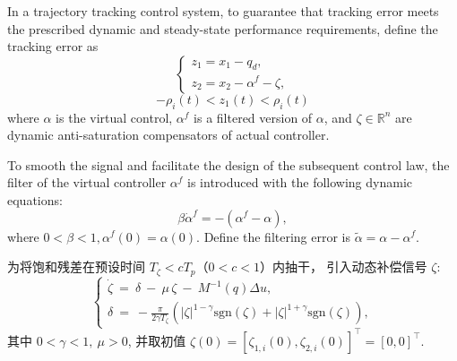 \documentclass[pdflatex,sn-mathphys-num]{sn-jnl}%
\theoremstyle{thmstyleone}%
\theoremstyle{thmstyletwo}%
\theoremstyle{thmstylethree}%
\begin{document}
\par In a trajectory tracking control system, to  guarantee that tracking error meets the prescribed dynamic and steady-state performance requirements, define the tracking error as
\begin{equation}\label{eq:20}
	\begin{cases}
		z_{1} = x_{1} - q_{d}, \\
	  z_{2} = x_{2} -\alpha^{f}-\zeta,
	\end{cases}
	\end{equation}
	\begin{equation}\label{eq:20}
			-\rho_i(t)<z_{1}(t)<\rho_i(t)
		\end{equation}
	where $\alpha$ is the virtual control, $\alpha^{f}$ is a filtered version of ${\alpha}$, and $\zeta \in\mathbb{R}^{n}$ are dynamic anti-saturation compensators of actual controller.






 To smooth the signal and facilitate the design of the subsequent control law, the filter of the virtual controller $\alpha^{f}$ is introduced with the following dynamic equations:
\begin{equation}\label{eq:22}
	\beta \dot{\alpha}^{f}
	= -\left(\alpha^{f}-\alpha\right),	
\end{equation}
where $0<\beta<1, \alpha^{f}(0)=\alpha(0)$. Define the filtering error is
$\tilde{\alpha}= \alpha-\alpha^{f}$.


为将饱和残差在预设时间 $T_\zeta<cT_p$（$0<c<1$）内抽干， 引入动态补偿信号 $\zeta$:
\begin{equation}\label{eq:zeta2-pts}
	\begin{cases}
\dot\zeta \ =\ \delta\ -\ \mu\,\zeta\ -\ M^{-1}(q)\Delta u,\\
\delta\ =\ -\frac{\pi}{2\gamma T_\zeta}\left(|\zeta|^{1- \gamma}\mathrm{sgn}(\zeta)+|\zeta|^{1+\gamma}\mathrm{sgn}(\zeta)\right),
	\end{cases}
\end{equation}
其中 $0<\gamma<1,\ \mu>0$, 并取初值 $\zeta(0)=[\zeta_{1,i}(0),\zeta_{2,i}(0)]^{\top}=[0,0]^{\top}$.
\end{document}
